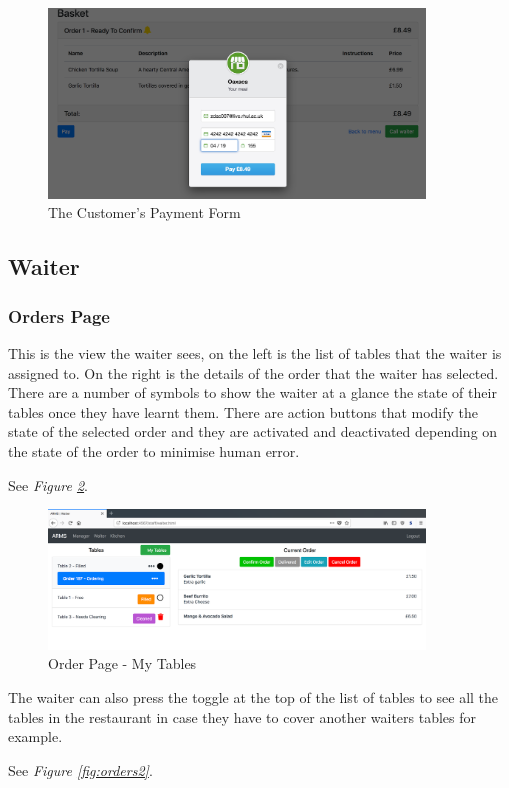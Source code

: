 \documentclass[12pt, twoside, a4paper]{report}
\begin{document}
\begin{figure}[H]
  \centering
  \includegraphics[width=10cm]{Payment.png}
  \caption{The Customer's Payment Form}
  \label{fig:pay}
\end{figure}

\subsection*{Waiter}
\subsubsection*{Orders Page}
This is the view the waiter sees, on the left is the list of tables that the waiter is assigned to.
On the right is the details of the order that the waiter has selected.
There are a number of symbols to show the waiter at a glance the state of their tables once they have learnt them.
There are action buttons that modify the state of the selected order and they are activated and deactivated depending on the state of the order to minimise human error.

See \textit{Figure \ref{fig:orders1}}.

\begin{figure}[H]
  \centering
  \includegraphics[width=10cm]{orders1.png}
  \caption{Order Page - My Tables}
  \label{fig:orders1}
\end{figure}

The waiter can also press the toggle at the top of the list of tables to see all the tables in the restaurant in case they have to cover another waiters tables for example.

See \textit{Figure \ref{fig:orders2}}.
\end{document}
